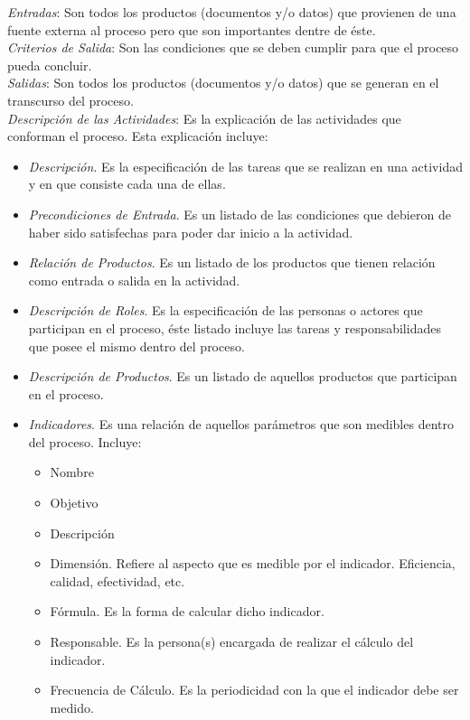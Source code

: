 \begin{footnotesize}
\textit{Entradas}: Son todos los productos (documentos y/o datos) que provienen de una fuente externa al proceso pero que son importantes dentre de éste.\\

\textit{Criterios de Salida}: Son las condiciones que se deben cumplir para que el proceso pueda concluir.\\

\textit{Salidas}: Son todos los productos (documentos y/o datos) que se generan en el transcurso del proceso.\\

\textit{Descripción de las Actividades}: Es la explicación de las actividades que conforman el proceso. Esta explicación incluye:\\

\begin{itemize}
\item \textit{Descripción}. Es la especificación de las tareas que se realizan en una actividad y en que consiste cada una de ellas.\\ 
\item \textit{Precondiciones de Entrada}. Es un listado de las condiciones que debieron de haber sido satisfechas para poder dar inicio a la actividad.\\
\item \textit{Relación de Productos}. Es un listado de los productos que tienen relación como entrada o salida en la actividad.\\
\item \textit{Descripción de Roles}. Es la especificación de las personas o actores que participan en el proceso, éste listado incluye las tareas y responsabilidades que posee el mismo dentro del proceso.\\
\item \textit{Descripción de Productos}. Es un listado de aquellos productos que participan en el proceso.\\
\item \textit{Indicadores}. Es una relación de aquellos parámetros que son medibles dentro del proceso. Incluye:\\

	\begin{itemize}
		\item Nombre
		\item Objetivo
		\item Descripción
		\item Dimensión. Refiere al aspecto que es medible por el indicador. Eficiencia, calidad, efectividad, etc.
		\item Fórmula. Es la forma de calcular dicho indicador.
		\item Responsable. Es la persona(s) encargada de realizar el cálculo del indicador.
		\item Frecuencia de Cálculo. Es la periodicidad con la que el indicador debe ser medido.
	\end{itemize}


\end{itemize}
\end{footnotesize}
